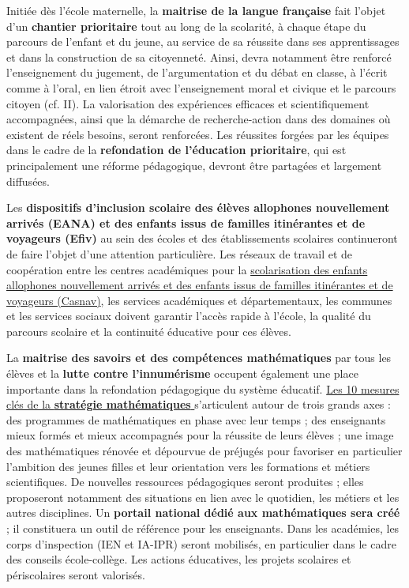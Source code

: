 Initiée dès l’école maternelle, la \textbf{maitrise de la langue française} fait l’objet d’un \textbf{chantier prioritaire} tout au long de la scolarité, à chaque étape du parcours de l’enfant et du jeune, au service de sa réussite dans ses apprentissages et dans la construction de sa citoyenneté. Ainsi, devra notamment être renforcé l’enseignement du jugement, de l’argumentation et du débat en classe, à l’écrit comme à l’oral, en lien étroit avec l’enseignement moral et civique et le parcours citoyen (cf. II). La valorisation des expériences efficaces et scientifiquement accompagnées, ainsi que la démarche de recherche-action dans des domaines où existent de réels besoins, seront renforcées. Les réussites forgées par les équipes dans le cadre de la \textbf{refondation de l’éducation prioritaire}, qui est principalement une réforme pédagogique, devront être partagées et largement diffusées.

Les \textbf{dispositifs d’inclusion scolaire des élèves allophones nouvellement arrivés (EANA) et des enfants issus de familles itinérantes et de voyageurs (Efiv)} au sein des écoles et des établissements scolaires continueront de faire l’objet d’une attention particulière. Les réseaux de travail et de coopération entre les centres académiques pour la \href{http://eduscol.education.fr/pid28783/scolariser-les-eleves-allophones-et-les-enfants-des-familles-itinerantes.html}{scolarisation des enfants allophones nouvellement arrivés et des enfants issus de familles itinérantes et de voyageurs (Casnav)}, les services académiques et départementaux, les communes et les services sociaux doivent garantir l’accès rapide à l’école, la qualité du parcours scolaire et la continuité éducative pour ces élèves.

La \textbf{maitrise des savoirs et des compétences mathématiques} par tous les élèves et la \textbf{lutte contre l’innumérisme} occupent également une place importante dans la refondation pédagogique du système éducatif. \href{http://www.education.gouv.fr/cid84398/strategie-mathematiques.html}{Les 10 mesures clés de la \textbf{\og stratégie mathématiques \fg{}}} s’articulent autour de trois grands axes : des programmes de mathématiques en phase avec leur temps ; des enseignants mieux formés et mieux accompagnés pour la réussite de leurs élèves ; une image des mathématiques rénovée et dépourvue de préjugés pour favoriser en particulier l’ambition des jeunes filles et leur orientation vers les formations et métiers scientifiques. De nouvelles ressources pédagogiques seront produites ; elles proposeront notamment des situations en lien avec le quotidien, les métiers et les autres disciplines. Un \textbf{portail national dédié aux mathématiques sera créé} ; il constituera un outil de référence pour les enseignants. Dans les académies, les corps d’inspection (IEN et IA-IPR) seront mobilisés, en particulier dans le cadre des conseils école-collège. Les actions éducatives, les projets scolaires et périscolaires seront valorisés.

